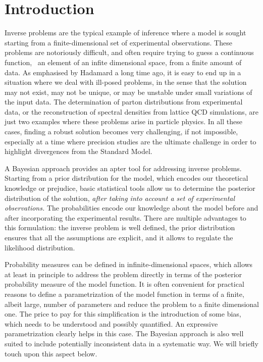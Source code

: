 \section{Introduction}
\label{sec:Intro}

Inverse problems are the typical example of inference where a model is sought
starting from a finite-dimensional set of experimental observations. These
problems are notoriously difficult, and often require trying to guess a
continuous function, \ie\ an element of an infite dimensional space, from a
finite amount of data. As emphasised by Hadamard a long time ago, it is easy to
end up in a situation where we deal with ill-posed problems, in the sense that
the solution may not exist, may not be unique, or may be unstable under small
variations of the input data. The determination of parton distributions from
experimental data, or the reconstruction of spectral densities from lattice QCD
simulations, are just two examples where these problems arise in particle
physics. In all these cases, finding a robust solution becomes very challenging,
if not impossible, especially at a time where precision studies are the ultimate
challenge in order to highlight divergences from the Standard Model. 

A Bayesian approach provides an apter tool for addressing inverse problems.
Starting from a prior distribution for the model, which encodes our theoretical
knowledge or prejudice, basic statistical tools allow us to determine the
posterior distribution of the solution, {\it after taking into account a set of
experimental observations.} The probabilities encode our knowledge about the
model before and after incorporating the experimental results. There are
multiple advantages to this formulation: the inverse problem is well defined,
the prior distribution ensures that all the assumptions are explicit, and it
allows to regulate the likelihood distribution. 

Probability measures can be defined in infinite-dimensional spaces, which allows
at least in principle to address the problem directly in terms of the posterior
probability measure of the model function. It is often convenient for practical
reasons to define a parametrization of the model function in terms of a finite,
albeit large, number of parameters and reduce the problem to a finite
dimensional one. The price to pay for this simplification is the introduction of
some bias, which needs to be understood and possibly quantified. An expressive
parametrization clearly helps in this case. The Bayesian approach is also well
suited to include potentially inconsistent data in a systematic way. We will
briefly touch upon this aspect below. 


